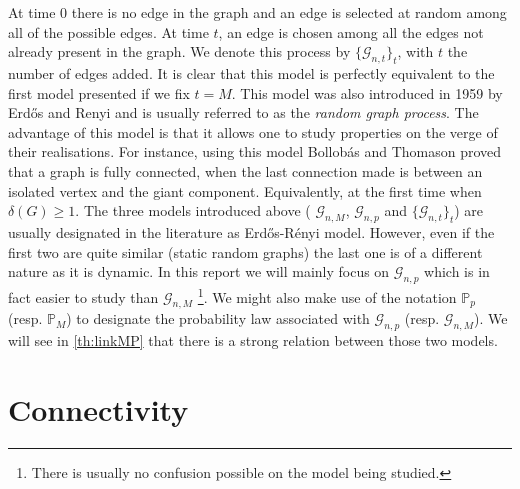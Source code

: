 At time 0 there is no edge in the graph and an edge is selected at random among all of the possible edges. 
At time $t$, an edge is chosen among all the edges not already present in the graph. We denote this process by $\{\mathcal{G}_{n, t}\}_t$, with $t$ the number of edges added. 
It is clear that this model is perfectly equivalent to the first model presented if we fix $t = M$. 
This model was also introduced in 1959 by Erd\H{o}s and Renyi and is usually referred to as the \emph{random graph process}.
The advantage of this model is that it allows one to study properties on the verge of their realisations.
For instance, using this model Bollob\'as and Thomason \cite{Bollob85} proved that a graph is fully connected, when the last connection made is between an isolated vertex and the giant component. Equivalently, at the first time when $\delta(G) \geq 1$.
\newline
The three models introduced above ( $\mathcal{G}_{n, M}$, $\mathcal{G}_{n, p}$ and $\{\mathcal{G}_{n, t}\}_t $) are usually designated in the literature as Erd\H{o}s-R\'enyi model.
However, even if the first two are quite similar (static random graphs) the last one is of a different nature as it is dynamic.
\newline
In this report we will mainly focus on $\mathcal{G}_{n, p}$ which is in fact easier to study than $\mathcal{G}_{n,M}$
\footnote{There is usually no confusion possible on the model being studied.}.
We might also make use of the notation $\mathbb{P}_{p}$ (resp. $\mathbb{P}_{M}$) to designate the probability law associated with $\mathcal{G}_{n, p}$ (resp. $\mathcal{G}_{n,M}$).
We will see in \eqref{th:linkMP} that there is a strong relation between those two models.

\section{Connectivity}

